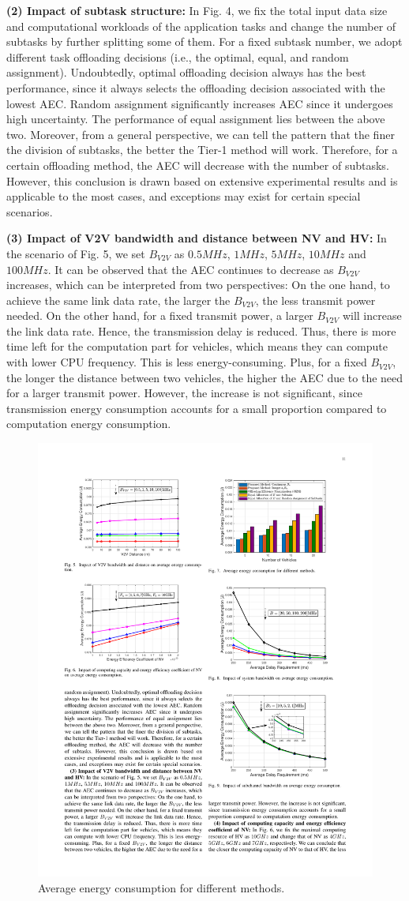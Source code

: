 \documentclass[lettersize,journal]{IEEEtran}
\begin{document}
\textbf{(2) Impact of subtask structure:} In Fig. 4, we fix the total input data size and computational workloads of the application tasks and change the number of subtasks by further splitting some of them. For a fixed subtask number, we adopt different task offloading decisions (i.e., the optimal, equal, and random assignment). Undoubtedly, optimal offloading decision always has the best performance, since it always selects the offloading decision associated with the lowest AEC. Random assignment significantly increases AEC since it undergoes high uncertainty. The performance of equal assignment lies between the above two. Moreover, from a general perspective, we can tell the pattern that the finer the division of subtasks, the better the Tier-1 method will work. Therefore, for a certain offloading method, the AEC will decrease with the number of subtasks. However, this conclusion is drawn based on extensive experimental results and is applicable to the most cases, and exceptions may exist for certain special scenarios.


\textbf{(3) Impact of V2V bandwidth and distance between NV and HV:} In the scenario of Fig. 5, we set $B_{V2V}$ as $0.5 MHz$, $1 MHz$, $5 MHz$, $10 MHz$ and $100 MHz$. It can be observed that the AEC continues to decrease as $B_{V2V}$ increases, which can be interpreted from two perspectives: On the one hand, to achieve the same link data rate, the larger the $B_{V2V}$, the less transmit power needed. On the other hand, for a fixed transmit power, a larger $B_{V2V}$ will increase the link data rate. Hence, the transmission delay is reduced. Thus, there is more time left for the computation part for vehicles, which means they can compute with lower CPU frequency. This is less energy-consuming. Plus, for a fixed $B_{V2V}$, the longer the distance between two vehicles, the higher the AEC due to the need for a larger transmit power. However, the increase is not significant, since transmission energy consumption accounts for a small proportion compared to computation energy consumption.

\begin{figure}[!t]
\centering
\includegraphics[width=2.8 in]{Figures/Tier_2_E1}
\caption{Average energy consumption for different methods.}
\label{fig_7}
\end{figure}
\end{document}
